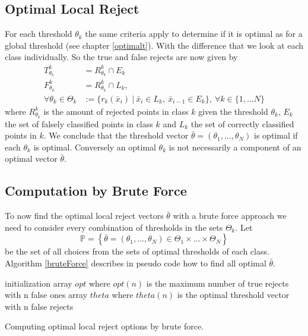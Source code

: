 \subsection{Optimal Local Reject}
For each threshold $\theta_k$ the same criteria apply to determine if it is optimal as for a global threshold (see chapter \ref{optimalt}). With the difference that we look at each class individually. So the true and false rejects are now given by
\begin{align} 
T_{\theta_k}^k &= R_{\theta_k}^k \cap E_k \\ 
F_{\theta_k}^k &= R_{\theta_k}^k \cap L_k, \\
\forall \theta_k \in \Theta_k &:= \{r_k(\bar{x}_i) \ | \ \bar{x}_i \in L_k, \ \bar{x}_{i-1} \in E_k\}, \ \forall k \in \{1,...N\}
\end{align}
where $R_{\theta_k}^k$ is the amount of rejected points in class $k$ given the threshold $\theta_k$, $E_k$ the set of falsely classified points in class $k$ and $L_k$ the set of correctly classified points in $k$. We conclude that the threshold vector $\bar{\theta}=(\theta_1,...,\theta_N)$ is optimal if each $\theta_k$ is optimal. Conversely an optimal $\theta_k$ is not necessarily a component of an optimal vector $\bar{\theta}$.


\subsection{Computation by Brute Force}
To now find the optimal local reject vectors $\bar{\theta}$ with a brute force approach we need to consider every combination of thresholds in the sets $\Theta_k$. Let
$$ \mathbb{P} = \left\{\bar{\theta} = \left(\theta_1,...,\theta_N\right) \in \Theta_1 \times ... \times \Theta_N \right\} $$
be the set of all choices from the sets of optimal thresholds of each class. Algorithm \ref{bruteForce} describes in pseudo code how to find all optimal $\bar{\theta}$.

\begin{algorithm}[!htbp]
 initialization\;
 array $opt$ where $opt(n)$ is the maximum number of true rejects with n false ones \;
 array $theta$ where $theta(n)$ is the optimal threshold vector with n false rejects \; 
 \BlankLine \BlankLine
 \caption{Computing optimal local reject options by brute force.}
 \label{bruteForce}
\end{algorithm}

